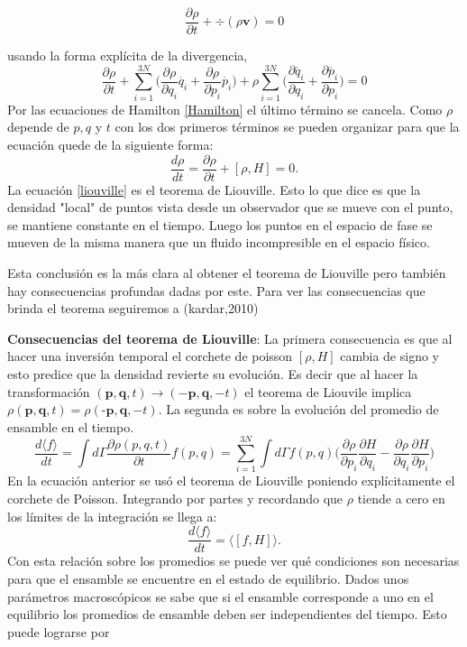 \begin{equation} \label{con}
 \frac{\partial \rho}{\partial t} + \div{ ( \rho\mathbf{v} ) }=0
\end{equation}

usando la forma explícita de la divergencia,
\begin{equation}
 \frac{\partial \rho}{\partial t} +\sum_{i=1}^{3N} \Big( \frac{\partial\rho}{\partial q_{i}}\dot{q_{i}}+  \frac{\partial\rho}{\partial p_{i}}\dot{p_{i}} \Big) + \rho \sum_{i=1}^{3N} \Big( \frac{\partial \dot{q_{i}}}{\partial q_{i}} + \frac{\partial \dot{p_{i}}}{\partial p_{i}}\Big)=0
\end{equation}
Por las ecuaciones de Hamilton \ref{Hamilton} el último término se cancela. Como $\rho$ depende de $p,q$ y $t$ con los dos primeros términos se pueden organizar para que la ecuación quede de la siguiente forma:
\begin{equation} \label{liouville}
\frac{d \rho}{dt}= \frac{\partial \rho}{\partial t} + [ \rho, H ]=0.
\end{equation}
La ecuación \ref{liouville} es el teorema de Liouville. Esto lo que dice es que la densidad "local" de puntos vista desde un observador que se mueve con el punto, se mantiene constante en el tiempo. Luego los puntos en el espacio de fase se mueven de la misma manera que un fluido incompresible en el espacio físico.

Esta conclusión es la más clara al obtener el teorema de Liouville pero también hay consecuencias profundas dadas por este. Para ver las consecuencias que brinda el teorema seguiremos a (kardar,2010) 

\textbf{ Consecuencias del teorema de Liouville}: La primera consecuencia es que al hacer una inversión temporal el corchete de poisson $[\rho, H]$ cambia de signo y esto predice que la densidad revierte su evolución. Es decir que al hacer la transformación $(\textbf{p},\textbf{q},t) \to (-\textbf{p},\textbf{q},-t)$ el teorema de Liouvile implica $\rho(\textbf{p},\textbf{q},t)=\rho(\textbf{-p},\textbf{q},-t)$.
La segunda es sobre la evolución del promedio de ensamble en el tiempo.
\begin{equation}
\frac{d \langle f \rangle}{dt}= \int d \Gamma \frac{\partial \rho(p,q,t)}{\partial t} f(p,q)= \sum_{i=1}^{3N} \int d\Gamma f(p,q) \Big( \frac{\partial \rho}{\partial p_{i}}\frac{\partial H}{\partial q_{i}} - \frac{\partial \rho}{\partial q_{i}}\frac{\partial H}{\partial p_{i}}  \Big)
\end{equation}
En la ecuación anterior se usó el teorema de Liouville poniendo explícitamente el corchete de Poisson. Integrando por partes y recordando que $\rho$ tiende a cero en los límites de la integración se llega a:
\begin{equation}
\frac{d \langle f \rangle}{dt}= \langle [f,H] \rangle.
\end{equation}
Con esta relación sobre los promedios se puede ver qué condiciones son necesarias para que el ensamble se encuentre en el estado de equilibrio. Dados unos parámetros macroscópicos se sabe que si el ensamble corresponde a uno en el equilibrio los promedios de ensamble deben ser independientes del tiempo. Esto puede lograrse por
 
